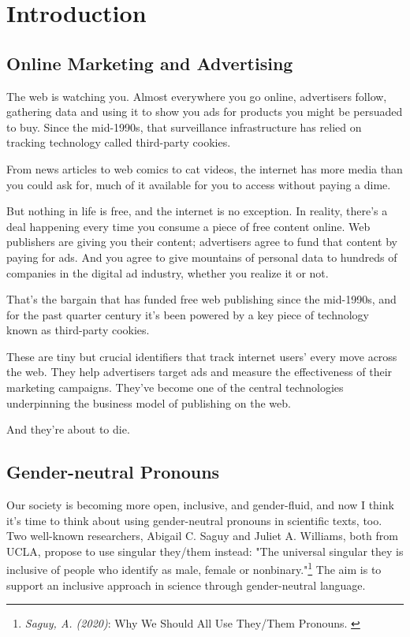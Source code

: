 %
%

\pagebreak
\section{Introduction}

\onehalfspacing

\subsection{Online Marketing and Advertising}

The web is watching you. Almost everywhere you go online, advertisers follow, gathering data and using it to show you ads for products you might be persuaded to buy. Since the mid-1990s, that surveillance infrastructure has relied on tracking technology called third-party cookies.

From news articles to web comics to cat videos, the internet has more media than you could ask for, much of it available for you to access without paying a dime.

But nothing in life is free, and the internet is no exception. In reality, there’s a deal happening every time you consume a piece of free content online. Web publishers are giving you their content; advertisers agree to fund that content by paying for ads. And you agree to give mountains of personal data to hundreds of companies in the digital ad industry, whether you realize it or not.

That’s the bargain that has funded free web publishing since the mid-1990s, and for the past quarter century it’s been powered by a key piece of technology known as third-party cookies.

These are tiny but crucial identifiers that track internet users’ every move across the web. They help advertisers target ads and measure the effectiveness of their marketing campaigns. They’ve become one of the central technologies underpinning the business model of publishing on the web.

And they’re about to die.

\subsection{Gender-neutral Pronouns}

Our society is becoming more open, inclusive, and gender-fluid, and now I think it's time to think about using gender-neutral pronouns in scientific texts, too. Two well-known researchers, Abigail C. Saguy and Juliet A. Williams, both from UCLA, propose to use singular they/them instead: "The universal singular they is inclusive of people who identify as male, female or nonbinary."\footnote{\textit{Saguy, A. (2020)}: Why We Should All Use They/Them Pronouns. \cite{pronouns}} The aim is to support an inclusive approach in science through gender-neutral language. 

